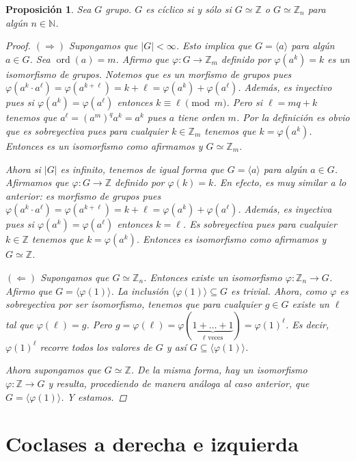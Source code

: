\documentclass[12pt]{book}
\newtheorem{prop}[teo]{Proposición}
\theoremstyle{definition}
\newcommand{\ZZ}{\mathbb{Z}}      %
\newcommand{\NN}{\mathbb{N}}
\DeclareMathOperator{\ord}{ord}
\begin{document}
\begin{prop}\label{prop::isociclico}
Sea $G$ grupo. $G$ es cíclico si y sólo si $G\simeq \ZZ$ o $G\simeq \ZZ_n$ para algún $n\in\NN$.
\begin{proof}
$(\Longrightarrow)$ Supongamos que $|G|<\infty$. Esto implica que $G = \langle a \rangle$ para algún $a\in G$. Sea $\ord(a)=m$. Afirmo que $\varphi:G\to \ZZ_{m}$ definido por $\varphi(a^k)=k$ es un isomorfismo de grupos. Notemos que es un morfismo de grupos pues $\varphi(a^k \cdot a^\ell) = \varphi(a^{k+\ell})= k+\ell = \varphi(a^k)+\varphi(a^\ell)$. Además, es inyectivo pues si $\varphi(a^k) = \varphi(a^\ell)$ entonces $k\equiv \ell \pmod{m}$. Pero si $\ell = mq + k$ tenemos que $a^{\ell} = (a^{m})^q a^k = a^k$ pues $a$ tiene orden $m$. Por la definición es obvio que es sobreyectiva pues para cualquier $k\in\ZZ_{m}$ tenemos que $k=\varphi(a^k)$. Entonces es un isomorfismo como afirmamos y $G\simeq \ZZ_{m}$.

Ahora si $|G|$ es infinito, tenemos de igual forma que $G = \langle a\rangle$ para algún $a\in G$. Afirmamos que $\varphi:G\to \ZZ$ definido por $\varphi(k) = k$. En efecto, es muy similar a lo anterior: es morfismo de grupos pues $\varphi(a^k\cdot a^\ell) = \varphi(a^{k+\ell}) = k+\ell = \varphi(a^k)+\varphi(a^\ell)$. Además, es inyectiva pues si $\varphi(a^k) = \varphi(a^\ell)$ entonces $k=\ell$. Es sobreyectiva pues para cualquier $k\in\ZZ$ tenemos que $k=\varphi(a^k)$. Entonces es isomorfismo como afirmamos y $G\simeq \ZZ$.

$(\Longleftarrow)$ Supongamos que $G\simeq \ZZ_n$. Entonces existe un isomorfismo $\varphi:\ZZ_n\to G$. Afirmo que $G = \langle \varphi(1)\rangle$. La inclusión $\langle \varphi(1)\rangle \subseteq G$ es trivial. Ahora, como $\varphi$ es sobreyectiva por ser isomorfismo, tenemos que para cualquier $g\in G$ existe un $\ell$ tal que $\varphi(\ell)=g$. Pero $g=\varphi(\ell)=\varphi(\underbrace{1+\ldots +1}_{\ell \text{ veces}}) = \varphi(1)^{\ell}$. Es decir, $\varphi(1)^\ell$ recorre todos los valores de $G$ y así $G\subseteq \langle \varphi(1) \rangle$.

Ahora supongamos que $G\simeq \ZZ$. De la misma forma, hay un isomorfismo $\varphi:\ZZ\to G$ y resulta, procediendo de manera análoga al caso anterior, que $G = \langle \varphi(1)\rangle$. Y estamos.
\end{proof}
\end{prop}

\section{Coclases a derecha e izquierda}
\end{document}
